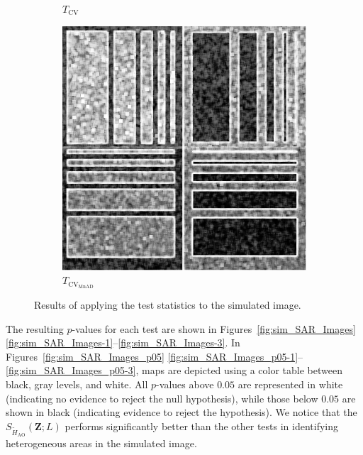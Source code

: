 \begin{figure}[H]
\begin{subfigure}[b]{0.3\textwidth}
    \caption{$T_\text{CV}$}
    \label{fig:sim_results-2}
  \end{subfigure}
  \hfill
  \begin{subfigure}[b]{0.3\textwidth}
    \centering
    \includegraphics[width=\textwidth]{../../Figures/PNG/mnad_Phantom_z1}
    \caption{$T_{\text{CV}_{\text{MnAD}}}$}
    \label{fig:sim_results-3}
  \end{subfigure}
  \caption{Results of applying the test statistics to the simulated image.}
  \label{fig:sim_results}
\end{figure}



The resulting \(p\)-values for each test are shown in
Figures~\ref{fig:sim_SAR_Images} \ref{fig:sim_SAR_Images-1}--\ref{fig:sim_SAR_Images-3}. In
Figures~\ref{fig:sim_SAR_Images_p05} \ref{fig:sim_SAR_Images_p05-1}--\ref{fig:sim_SAR_Images_p05-3}, maps are depicted using a
color table between black, gray levels, and white. All \(p\)-values
above \(0.05\) are represented in white (indicating no evidence to
reject the null hypothesis), while those below \(0.05\) are shown in
black (indicating evidence to reject the hypothesis). 
We notice that the \(S_{\widetilde{H}_{\text{AO}}}(\bm{Z}; L)\) performs significantly
better than the other tests in identifying heterogeneous areas in the
simulated image.

